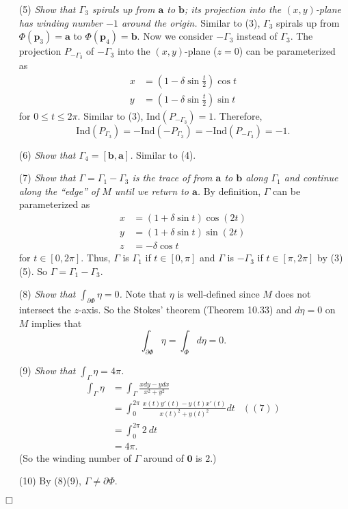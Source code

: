 \documentclass{article}
\begin{document}
\begin{enumerate}
\item[(5)]
  \emph{Show that $\Gamma_3$ spirals up from $\mathbf{a}$ to $\mathbf{b}$;
  its projection into the $(x,y)$-plane has winding number $-1$ around the origin.}
  Similar to (3),
  $\Gamma_3$ spirals up from $\Phi(\mathbf{p}_3) = \mathbf{a}$
  to $\Phi(\mathbf{p}_4) = \mathbf{b}$.
  Now we consider $-\Gamma_3$ instead of $\Gamma_3$.
  The projection $P_{-\Gamma_3}$ of $-\Gamma_3$ into the $(x,y)$-plane ($z = 0$)
  can be parameterized as
  \begin{align*}
    x &= \left(1-\delta\sin\frac{t}{2}\right) \cos t \\
    y &= \left(1-\delta\sin\frac{t}{2}\right) \sin t
  \end{align*}
  for $0 \leq t \leq 2\pi$.
  Similar to (3), $\mathrm{Ind}(P_{-\Gamma_3}) = 1$. Therefore,
  \[
    \mathrm{Ind}(P_{\Gamma_3})
    = -\mathrm{Ind}(-P_{\Gamma_3})
    = -\mathrm{Ind}(P_{-\Gamma_3})
    = -1.
  \]

\item[(6)]
  \emph{Show that $\Gamma_4 = [\mathbf{b}, \mathbf{a}]$.}
  Similar to (4).

\item[(7)]
  \emph{Show that $\Gamma = \Gamma_1 - \Gamma_3$
  is the trace of from $\mathbf{a}$ to $\mathbf{b}$ along $\Gamma_1$
  and continue along the ``edge'' of $M$ until we return to $\mathbf{a}$.}
  By definition, $\Gamma$ can be parameterized as
  \begin{align*}
    x &= (1+\delta\sin t) \cos(2t) \\
    y &= (1+\delta\sin t) \sin(2t) \\
    z &= -\delta \cos t
  \end{align*}
  for $t \in [0,2\pi]$.
  Thus, $\Gamma$ is $\Gamma_1$ if $t \in [0,\pi]$
  and $\Gamma$ is $-\Gamma_3$ if $t \in [\pi,2\pi]$ by (3)(5).
  So $\Gamma = \Gamma_1 - \Gamma_3$.

\item[(8)]
  \emph{Show that $\int_{\partial \Phi} \eta = 0$.}
  Note that $\eta$ is well-defined since $M$ does not intersect the $z$-axis.
  So the Stokes' theorem (Theorem 10.33) and $d\eta = 0$ on $M$ implies that
  \[
    \int_{\partial \Phi} \eta
    = \int_{\Phi} d\eta
    = 0.
  \]

\item[(9)]
  \emph{Show that $\int_{\Gamma} \eta = 4 \pi$.}
  \begin{align*}
    \int_{\Gamma} \eta
    &= \int_{\Gamma} \frac{xdy-ydx}{x^2+y^2} \\
    &= \int_{0}^{2\pi} \frac{x(t)y'(t) - y(t)x'(t)}{x(t)^2+y(t)^2} dt
      &((7)) \\
    &= \int_{0}^{2\pi} 2 \: dt \\
    &= 4 \pi.
  \end{align*}
  (So the winding number of $\Gamma$ around of $\mathbf{0}$ is $2$.)

\item[(10)]
  By (8)(9), $\Gamma \neq \partial \Phi$.
\end{enumerate}
$\Box$ \\\\



\end{document}
